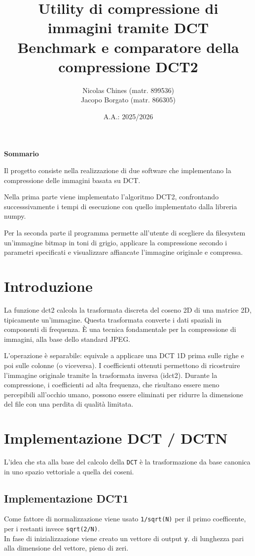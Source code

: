 \documentclass[italian]{article}
\title{
	Utility di compressione di immagini tramite DCT \\
	\normalsize Benchmark e comparatore della compressione DCT2
}
\date{A.A.: 2025/2026}
\author{
	\normalsize
	Nicolas Chines (matr. 899536) \\
	\normalsize
	Jacopo Borgato (matr. 866305)
}
\begin{document}
\maketitle


\centerline{\bfseries{Sommario}}
Il progetto consiste nella realizzazione di due software che implementano la compressione delle immagini basata su DCT.

Nella prima parte viene implementato l'algoritmo DCT2, confrontando successsivamente i tempi di esecuzione con quello implementato dalla libreria numpy.

Per la seconda parte il programma permette all'utente di scegliere da filesystem un'immagine bitmap in toni di grigio, applicare la compressione secondo i parametri specificati e visualizzare affiancate l'immagine originale e compressa.

\newpage

\tableofcontents

\newpage

\section{Introduzione}
La funzione dct2 calcola la trasformata discreta del coseno 2D di una matrice 2D, tipicamente un'immagine. Questa trasformata converte i dati spaziali in componenti di frequenza. \`E una tecnica fondamentale per la compressione di immagini, alla base dello standard JPEG. 

L'operazione \`e separabile: equivale a applicare una DCT 1D prima sulle righe e poi sulle colonne (o viceversa). I coefficienti ottenuti permettono di ricostruire l'immagine originale tramite la trasformata inversa (idct2). Durante la compressione, i coefficienti ad alta frequenza, che risultano essere meno percepibili all'occhio umano, possono essere eliminati per ridurre la dimensione del file con una perdita di qualità limitata.

\section{Implementazione DCT / DCTN}
L'idea che sta alla base del calcolo della \texttt{DCT} \`e la trasformazione da base canonica in uno spazio vettoriale a quella dei coseni.\\

\subsection{Implementazione DCT1}
Come fattore di normalizzazione viene usato \texttt{1/sqrt(N)} per il primo coefficente, per i restanti invece \texttt{sqrt(2/N)}.\\
In fase di inizializzazione viene creato un vettore di output \texttt{y}. di lunghezza pari alla dimensione del vettore, pieno di zeri.
\end{document}
